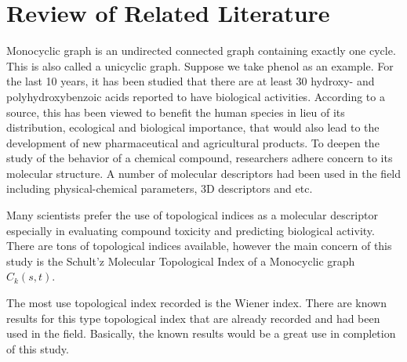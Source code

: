 \section{Review of Related Literature}
\cite{eff_enum} Monocyclic graph is an undirected connected graph
containing exactly one cycle. This is also called a unicyclic graph. Suppose we take phenol as an example. \cite{monocyclic_ex} For the last 10 years, it has been studied that there are at least 30 hydroxy- and polyhydroxybenzoic acids reported to have biological activities. According to a source, this has been viewed to benefit the human species in lieu of its distribution, ecological and biological importance, that would also lead to the development of new pharmaceutical and agricultural products. To deepen the study of the behavior of a chemical compound, researchers adhere concern to its molecular structure. A number of molecular descriptors had been used in the field including physical-chemical parameters, 3D descriptors and etc. \medskip

\cite{jds-172} Many scientists prefer the use of topological indices as a molecular descriptor especially in evaluating compound toxicity and predicting biological activity. There are tons of topological indices available, however the main concern of this study is the Schult'z Molecular Topological Index of a Monocyclic graph $C_k(s,t)$. \medskip
 
The most use topological index recorded is the Wiener index. There are known results for this type topological index that are already recorded and had been used in the field. Basically, the known results would be a great use in completion of this study. 